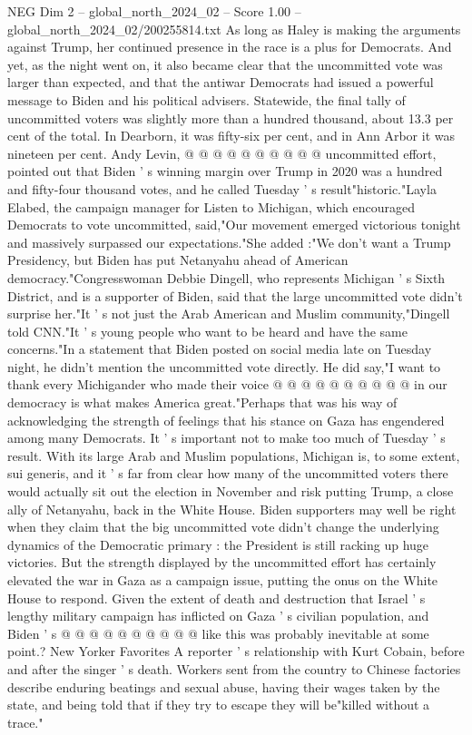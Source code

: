 \begin{textsample}{NEG Dim 2 – global\_north\_2024\_02 – Score 1.00 – global\_north\_2024\_02/200255814.txt}
As long as Haley is making the arguments against Trump, her continued presence in the race is a plus for Democrats.
And yet, as the night went on, it also became clear that the uncommitted vote was larger than expected, and that the antiwar Democrats had issued a powerful message to Biden and his political advisers.
Statewide, the final tally of uncommitted voters was slightly more than a hundred thousand, about 13.3 per cent of the total.
In Dearborn, it was fifty-six per cent, and in Ann Arbor it was nineteen per cent.
Andy Levin, @ @ @ @ @ @ @ @ @ @ uncommitted effort, pointed out that Biden ' s winning margin over Trump in 2020 was a hundred and fifty-four thousand votes, and he called Tuesday ' s result"historic."Layla Elabed, the campaign manager for Listen to Michigan, which encouraged Democrats to vote uncommitted, said,"Our movement emerged victorious tonight and massively surpassed our expectations."She added :"We don't want a Trump Presidency, but Biden has put Netanyahu ahead of American democracy."Congresswoman Debbie Dingell, who represents Michigan ' s Sixth District, and is a supporter of Biden, said that the large uncommitted vote didn't surprise her."It ' s not just the Arab American and Muslim community,"Dingell told CNN."It ' s young people who want to be heard and have the same concerns."In a statement that Biden posted on social media late on Tuesday night, he didn't mention the uncommitted vote directly.
He did say,"I want to thank every Michigander who made their voice @ @ @ @ @ @ @ @ @ @ in our democracy is what makes America great."Perhaps that was his way of acknowledging the strength of feelings that his stance on Gaza has engendered among many Democrats.
It ' s important not to make too much of Tuesday ' s result.
With its large Arab and Muslim populations, Michigan is, to some extent, sui generis, and it ' s far from clear how many of the uncommitted voters there would actually sit out the election in November and risk putting Trump, a close ally of Netanyahu, back in the White House.
Biden supporters may well be right when they claim that the big uncommitted vote didn't change the underlying dynamics of the Democratic primary : the President is still racking up huge victories.
But the strength displayed by the uncommitted effort has certainly elevated the war in Gaza as a campaign issue, putting the onus on the White House to respond.
Given the extent of death and destruction that Israel ' s lengthy military campaign has inflicted on Gaza ' s civilian population, and Biden ' s @ @ @ @ @ @ @ @ @ @ like this was probably inevitable at some point.?
New Yorker Favorites A reporter ' s relationship with Kurt Cobain, before and after the singer ' s death.
Workers sent from the country to Chinese factories describe enduring beatings and sexual abuse, having their wages taken by the state, and being told that if they try to escape they will be"killed without a trace."

\end{textsample}
